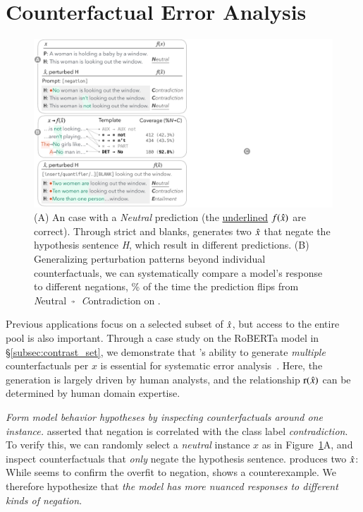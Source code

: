 \section{Counterfactual Error Analysis}
\label{sec:app_err_analysis}

%
\begin{figure}[t]
\centering
\includegraphics[trim={0 11cm 33cm 0cm},clip,width=1\columnwidth]{figures/err_analysis.pdf}
\vspace{-15pt}
\caption{
(A) An \nli case with a \emph{Neutral} prediction (the \uline{underlined} $f(\hat{x})$ are correct).
Through strict \tagstrs and blanks, \sysname generates two $\hat{x}$ that negate the hypothesis sentence \emph{H}, which result in different predictions.
(B) Generalizing perturbation patterns beyond individual counterfactuals, we can systematically compare a model's response to different negations, \% of the time the prediction flips from \emph{N}eutral~$\veryshortarrow$~\emph{C}ontradiction on .
}
\vspace{-10pt}
\label{fig:err_analysis}
\end{figure}


Previous applications focus on a selected subset of $\hat{x}$, but access to the entire pool is also important.
Through a case study on the \nli RoBERTa model in \S\ref{subsec:contrast_set}, we demonstrate that \sysname's ability to generate \emph{multiple} counterfactuals per $x$ is essential for systematic error analysis~\cite{wu2019errudite}.
Here, the generation is largely driven by human analysts, and the relationship $\operatorname*{r}(\hat{x})$ can be determined by human domain expertise.

\emph{Form model behavior hypotheses by inspecting counterfactuals around one instance.}
\citet{gururangan2018annotation} asserted that negation is correlated with the class label \emph{contradiction}. 
To verify this, we can randomly select a \emph{neutral} instance $x$ as in Figure~\ref{fig:err_analysis}A, and inspect counterfactuals that \emph{only} negate the hypothesis sentence.
\sysname produces two $\hat{x}$:
While  seems to confirm the overfit to negation,  shows a counterexample. 
We therefore hypothesize that
\emph{the model has more nuanced responses to different kinds of negation}.

